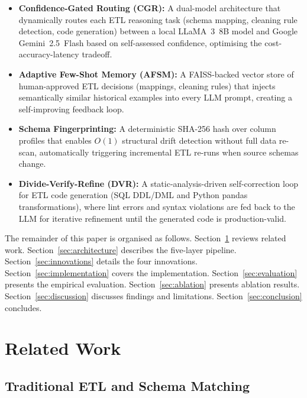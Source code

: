 \documentclass[9pt,a4paper,twocolumn,twoside]{rho-class/rho}
\begin{document}
    \begin{itemize}
        \item \textbf{Confidence-Gated Routing (CGR):} A dual-model architecture that dynamically routes each ETL reasoning task (schema mapping, cleaning rule detection, code generation) between a local LLaMA~3~8B model and Google Gemini~2.5~Flash based on self-assessed confidence, optimising the cost-accuracy-latency tradeoff.
        \item \textbf{Adaptive Few-Shot Memory (AFSM):} A FAISS-backed vector store of human-approved ETL decisions (mappings, cleaning rules) that injects semantically similar historical examples into every LLM prompt, creating a self-improving feedback loop.
        \item \textbf{Schema Fingerprinting:} A deterministic SHA-256 hash over column profiles that enables $O(1)$ structural drift detection without full data re-scan, automatically triggering incremental ETL re-runs when source schemas change.
        \item \textbf{Divide-Verify-Refine (DVR):} A static-analysis-driven self-correction loop for ETL code generation (SQL DDL/DML and Python pandas transformations), where lint errors and syntax violations are fed back to the LLM for iterative refinement until the generated code is production-valid.
    \end{itemize}

    The remainder of this paper is organised as follows. Section~\ref{sec:related} reviews related work. Section~\ref{sec:architecture} describes the five-layer pipeline. Section~\ref{sec:innovations} details the four innovations. Section~\ref{sec:implementation} covers the implementation. Section~\ref{sec:evaluation} presents the empirical evaluation. Section~\ref{sec:ablation} presents ablation results. Section~\ref{sec:discussion} discusses findings and limitations. Section~\ref{sec:conclusion} concludes.


\section{Related Work}
\label{sec:related}

    \subsection{Traditional ETL and Schema Matching}
\end{document}
